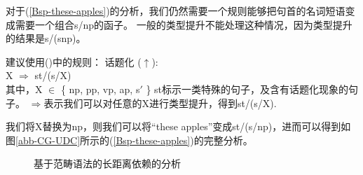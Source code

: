 对于(\ref{Bsp-these-apples})的分析，我们仍然需要一个规则能够把句首的名词短语变成需要一个组合s/np的函子。
一般的类型提升不能处理这种情况，因为类型提升的结果是s/(s\bs np)。

\citet[]{Steedman89a}建议使用()中的规则：
\ea
\label{Regel-Topikalisierung}
话题化 ($\uparrow$\is{$\uparrow$}):\\
X $\Rightarrow$ st/(s/X)\\
其中，X $\in$ \{ np, pp, vp, ap, s$'$ \}
\z
st标示一类特殊的句子，及含有话题化现象的句子。
$\Rightarrow$表示我们可以对任意的X进行类型提升，得到st/(s/X). 

我们将X替换为np，则我们可以将``{these apples}''变成st/(s/np)，进而可以得到如图\vref{abb-CG-UDC}所示的(\ref{Bsp-these-apples})的完整分析。

\begin{figure}
\centerline{%
}
\caption{\label{abb-CG-UDC}基于范畴语法的长距离依赖的分析}
\end{figure}%


